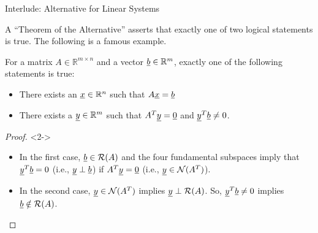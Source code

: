 \documentclass[10pt,letterpaper,english]{beamer}
\begin{document}
\begin{frame}{Interlude: Alternative for Linear Systems}

A ``Theorem of the Alternative'' asserts that exactly one of two logical statements is true. The following is a famous example.

\begin{theorem}
For a matrix $A \in \mathbb{R}^{m\times n}$ and a vector $\underline{b}\in \mathbb{R}^m$, exactly one of the following statements is true:
\begin{itemize}
\item There exists an $\underline{x}\in \mathbb{R}^n$ such that $A\underline{x} = \underline{b}$
\item There exists a $\underline{y} \in \mathbb{R}^m$ such that $A^T \underline{y} = \underline{0}$ and $\underline{y}^T \underline{b} \neq 0$.
\end{itemize} 
\end{theorem}

\begin{proof}<2->
\begin{itemize}
\item In the first case, $\underline{b} \in \mathcal{R}(A)$ and the four fundamental subspaces imply that $\underline{y}^T \underline{b} = 0$ (i.e., $\underline{y} \perp \underline{b}$) if $A^T \underline{y} = \underline{0}$ (i.e., $\underline{y}\in \mathcal{N}(A^T)$).
\item In the second case, $\underline{y} \in \mathcal{N}(A^T)$ implies $\underline{y} \perp \mathcal{R}(A)$.
So, $\underline{y}^T \underline{b} \neq 0$ implies $\underline{b} \notin \mathcal{R}(A)$. \qedhere
\end{itemize}
\end{proof}


\end{frame}
\end{document}
